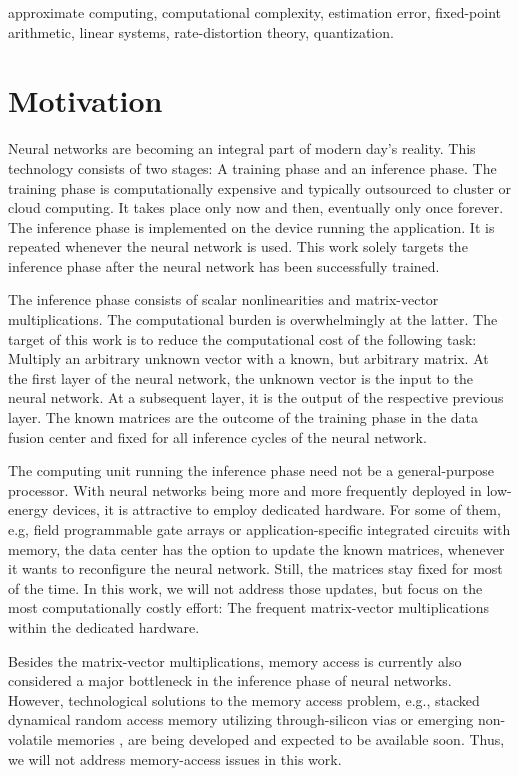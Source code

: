 \documentclass[twocolumn]{IEEEtran}
\begin{document}
\IEEEpeerreviewmaketitle

\begin{IEEEkeywords}
approximate computing, computational complexity, estimation error, fixed-point arithmetic, linear systems, rate-distortion theory, quantization.
\end{IEEEkeywords}

\section{Motivation}
\label{sec:intro}
Neural networks are becoming an integral part of modern day's reality. This technology consists of two stages: A training phase and an inference phase. The training phase is computationally expensive and typically outsourced to cluster or cloud computing. It takes place only now and then, eventually only once forever. The inference phase is implemented on the device running the application. It is repeated whenever the neural network is used. This work solely targets the inference phase after the neural network has been successfully trained.

The inference phase consists of scalar nonlinearities and matrix-vector multiplications. The computational burden is overwhelmingly at the latter. The target of this work is to reduce the computational cost of the following task: Multiply an arbitrary unknown vector with a known, but arbitrary matrix. At the first layer of the neural network, the unknown vector is the input to the neural network. At a subsequent layer, it is the output of the respective previous layer. The known matrices are the outcome of the training phase in the data fusion center and fixed for all inference cycles of the neural network.

The computing unit running the inference phase need not be a general-purpose processor. With neural networks being more and more frequently deployed in low-energy devices, it is attractive to employ dedicated hardware. For some of them, e.g, field programmable gate arrays or application-specific integrated circuits with memory, the data center has the option to update the known matrices, whenever it wants to reconfigure the neural network. Still, the matrices stay fixed for most of the time. In this work, we will not address those updates, but focus on the most computationally costly effort: The frequent matrix-vector multiplications within the dedicated hardware.

Besides the matrix-vector multiplications, memory access is currently also considered a major bottleneck in the inference phase of neural networks. However, technological solutions to the memory access problem, e.g., stacked dynamical random access memory utilizing through-silicon vias \cite{shen:18} or emerging non-volatile memories \cite{hong:14}, are being developed and expected to be available soon. Thus, we will not address memory-access issues in this work. 
\end{document}
